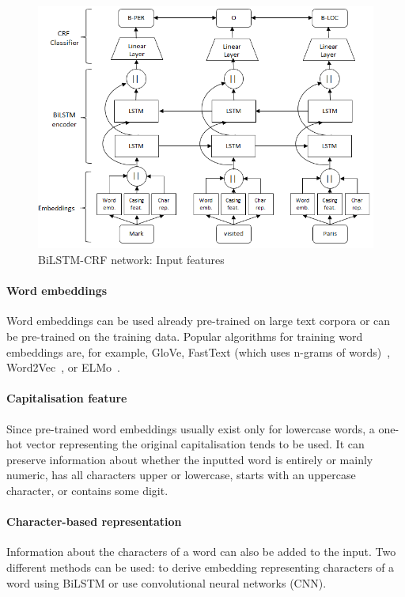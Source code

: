 \begin{figure}[htbp]
    \centering
  \includegraphics[width=\textwidth]{text/images/bilstm_crf_input.png}
  \caption{BiLSTM-CRF network: Input features~\cite{BiLSTMCRFHyperparameters}}\label{img:bi-lstm-crf-input}
\end{figure}

\paragraph{Word embeddings}
Word embeddings can be used already pre-trained on large text corpora or can be pre-trained on the training data. Popular algorithms for training word embeddings are, for example, GloVe, FastText (which uses n-grams of words)~\cite{BiLSTMCRFHyperparameters}, Word2Vec~\cite{Word2Vec}, or ELMo~\cite{ELMo}.

\paragraph{Capitalisation feature}
Since pre-trained word embeddings usually exist only for lowercase words, a one-hot vector representing the original capitalisation tends to be used. It can preserve information about whether the inputted word is entirely or mainly numeric, has all characters upper or lowercase, starts with an uppercase character, or contains some digit.~\cite{BiLSTMCRFHyperparameters}

\paragraph{Character-based representation}
Information about the characters of a word can also be added to the input. Two different methods can be used: to derive embedding representing characters of a word using BiLSTM or use convolutional neural networks (CNN).~\cite{BiLSTMCRFHyperparameters}

